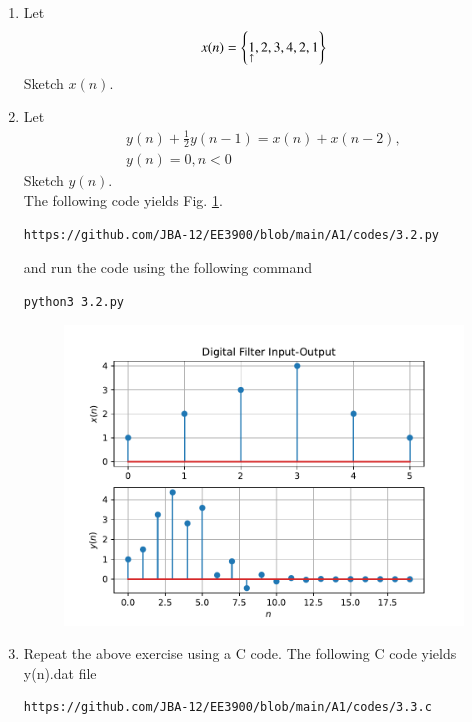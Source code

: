 \documentclass[journal,12pt,twocolumn]{IEEEtran}
\renewcommand\thesection{\arabic{section}}
\begin{document}
\begin{enumerate}[label=\thesection.\arabic*,ref=\thesection.\theenumi]
\item Let
\label{def:xn}
\begin{equation}
x(n) = \left\{\underset{\uparrow}{1},2,3,4,2,1\right\}
\end{equation}
Sketch $x(n)$.
\item Let
\begin{multline}
\label{eq:iir_filter}
y(n) + \frac{1}{2}y(n-1) = x(n) + x(n-2), 
\\
 y(n) = 0, n < 0
\end{multline}
Sketch $y(n)$.
\\
\solution The following code yields Fig. \ref{fig:xnyn}.
\begin{lstlisting}
https://github.com/JBA-12/EE3900/blob/main/A1/codes/3.2.py
\end{lstlisting}
and run the code using the following command
\begin{lstlisting}
python3 3.2.py
\end{lstlisting}
\begin{figure}[!ht]
\begin{center}
\includegraphics[width=\columnwidth]{./figs/xnyn}
\end{center}
\label{fig:xnyn}	
\end{figure}
\item Repeat the above exercise using a C code.
\solution The following C code yields y(n).dat file
\begin{lstlisting}
https://github.com/JBA-12/EE3900/blob/main/A1/codes/3.3.c

\end{lstlisting}
\end{enumerate}
\end{document}
